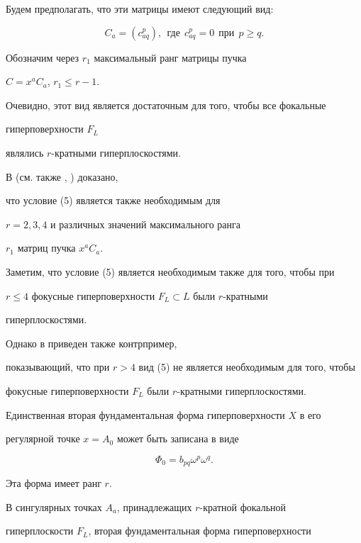 Будем предполагать, что эти  матрицы имеют следующий вид:


\begin{equation}\label{eq:7}


C_a = (c_{aq}^p), \ \ \text{где} \ \ c^p_{aq} = 0 \ \ \text{при} \ \ 


p \geq q.


\end{equation}


Обозначим через $r_1$ максимальный ранг матрицы пучка


$C = x^a C_a$, $r_1 \leq r - 1$.





Очевидно, этот вид является достаточным для того, чтобы все фокальные


гиперповерхности $F_L$


являлись $r$-кратными гиперплоскостями.


В \cite{WZ02} (см. также \cite{P01}, \cite{P02}) доказано,


что условие (5) является также необходимым для


$r = 2, 3, 4$ и различных значений максимального ранга


$r_1$ матриц пучка  $x^aC_a$.


Заметим, что условие (5) является необходимым также для того, чтобы при


$r\le 4$ фокусные гиперповерхности $F_L\subset L$ были $r$-кратными


гиперплоскостями.


Однако в \cite{WZ02} приведен также контрпример,


показывающий, что при $r>4$ вид (5) не является необходимым для того, чтобы


фокусные гиперповерхности $F_L$ были $r$-кратными гиперплоскостями.





Единственная вторая фундаментальная форма гиперповерхности $X$ в его


регулярной точке  $x =A_0$ может быть записана в виде


$$


\Phi_0 = b_{pq} \omega^p \omega^q.


$$


Эта форма имеет ранг $r$.


В сингулярных точках $A_a$, принадлежащих $r$-кратной фокальной


гиперплоскости $F_L$, вторая фундаментальная форма гиперповерхности


